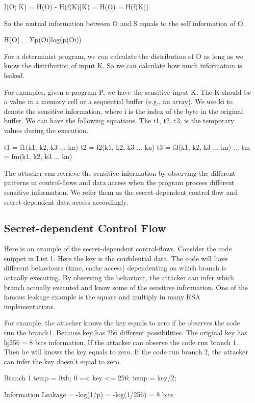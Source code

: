 I(O; K) = H(O) - H(f(K)|K) = H(O) = H(f(K))

So the mutual information between O and S equals to the self information of O. 

H(O) = Σp(Oi)log(p(Oi))

For a determinist program, we can calculate the distribution of O as long as we know the distribution of input K. So we can calculate how much information is leaked.

For examples, given a program P, we have the sensitive input K. The K should be a value in a memory cell or a sequential buffer (e.g., an array). We use ki to denote the sensitive information, where i is the index of the byte in the original buffer.  We can have the following equations. The t1, t2, t3, is the temporary values during the execution.

t1 = f1(k1, k2, k3 ... kn)
t2 = f2(k1, k2, k3 ... kn)
t3 = f3(k1, k2, k3 ... kn)
...
tm = fm(k1, k2, k3 ... kn)

The attacker can retrieve the sensitive information by observing the different patterns in control-flows and data access when the program process different sensitive information. We refer them as the secret-dependent control flow and secret-dependent data access accordingly.

\subsection{Secret-dependent Control Flow}
Here is an example of the secret-dependent control-flows. Consider the code snippet in List 1. Here the key is the confidential data. The code will have different behaviours (time, cache access) dependenting on which branch is actually executing. By observing the behaviour, the attacker can infer which branch actually executed and know some of the sensitive information. One of the famous leakage example is the square and multiply in many RSA implementations. 

For example, the attacker knows the key equals to zero if he observes the code run the branch1. Because key has 256 different possibilities. The original key has lg256 = 8 bits information. If the attacker can observe the code run branch 1. Then he will knows the key equals to zero. If the code run branch 2, the attacker can infer the key doesn’t equal to zero. 

Branch 1
temp = 0xb;
0 =< key <= 256;
temp = key/2;

Information Leakage = -log(1/p) = -log(1/256) = 8 bits

